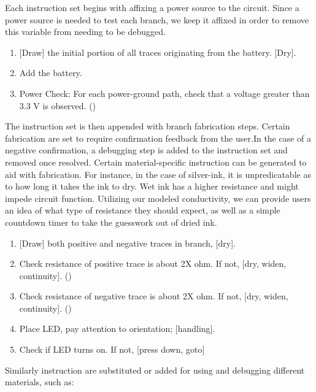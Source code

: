 \documentclass{sigchi}
\begin{document}
        Each instruction set begins with affixing a power source to the circuit. Since a power source is needed to test each branch, we keep it affixed in order to remove this variable from needing to be debugged. 
        \begin{enumerate}
              \item {[}Draw{]} the initial portion of all traces originating from the battery. [Dry].
              \item Add the battery.
              \item Power Check: For each power-ground path, check that a voltage greater than 3.3 V is observed. ()
        \end{enumerate}

        The instruction set is then appended with branch fabrication steps. Certain fabrication are set to require confirmation feedback from the user.In the case of a negative confirmation, a debugging step is added to the instruction set and removed once resolved. Certain material-specific instruction can be generated to aid with fabrication. For instance, in the case of silver-ink, it is unpredicatable as to how long it takes the ink to dry. Wet ink has a higher resistance and might impede circuit function. Utilizing our modeled conductivity, we can provide users an idea of what type of resistance they should expect, as well as a simple countdown timer to take the guesswork out of dried ink.  
          \begin{enumerate}  
              \item {[}Draw{]} both positive and negative traces in branch, [dry].
              \item Check resistance of positive trace is about 2X ohm. If not, [dry, widen, continuity]. ()
              \item Check resistance of negative trace is about 2X ohm. If not, [dry, widen, continuity]. ()
              \item Place LED, pay attention to orientation; [handling].
              \item Check if LED turns on. If not, [press down, goto]
          \end{enumerate}
        Similarly instruction are substituted or added for using and debugging different materials, such as:
\end{document}
